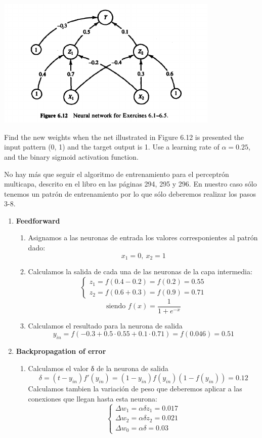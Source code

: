 \begin{center}
\includegraphics[width=0.8\textwidth]{img/figure6-12.png}
\end{center}

\begin{problem}[1]
Find the new weights when the net illustrated in Figure 6.12 is presented the input pattern (0, 1) and the target output is 1. Use a learning rate of $α = 0.25$, and the binary sigmoid activation function.

\solution

No hay más que seguir el algoritmo de entrenamiento para el perceptrón multicapa, descrito en el libro en las páginas 294, 295 y 296. En nuestro caso sólo tenemos un patrón de entrenamiento por lo que sólo deberemos realizar los pasos 3-8.

\begin{enumerate}
\item \textbf{Feedforward}
\begin{enumerate}
\item Asignamos a las neuronas de entrada los valores corresponientes al patrón dado:
\[x_1 = 0, \ x_2 = 1\]
\item Calculamos la salida de cada una de las neuronas de la capa intermedia:
\[\left\{ \begin{array}{l}
z_1 = f(0.4 -0.2) = f(0.2) = 0.55 \\
z_2 = f(0.6+0.3) =f(0.9) = 0.71
\end{array}\right.\]
\[\text{siendo }f(x) = \frac{1}{1+e^{-x}} \]

\item Calculamos el resultado para la neurona de salida
\[y_{in} = f(-0.3+0.5\cdot 0.55 + 0.1 \cdot 0.71)=f(0.046) = 0.51\]
\end{enumerate}
\item \textbf{Backpropagation of error}
\begin{enumerate}
\item Calculamos el valor δ de la neurona de salida
\[δ = (t-y_{in})f'(y_{in}) = (1-y_{in})f(y_{in})(1-f(y_{in})) = 0.12\]
Calculamos tambien la variación de peso que deberemos aplicar a las conexiones que llegan hasta esta neurona:
\[\left\{ \begin{array}{l}
Δw_1= αδz_1 = 0.017 \\
Δw_2= αδz_2 = 0.021 \\
Δw_0= αδ = 0.03
\end{array}\right.\]


\end{enumerate}
\end{enumerate}
\end{problem}
